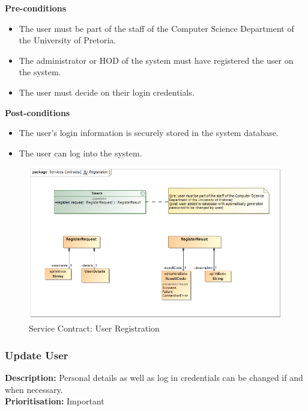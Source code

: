 \documentclass[a4paper]{article}
\begin{document}
    \textbf{Pre-conditions}
     \begin{itemize}
        \item The user must be part of the staff of the Computer Science Department of the University of Pretoria.
        \item The administrator or HOD of the system must have registered the user on the system.
        \item The user must decide on their login credentials.
   \end{itemize}
    
    \textbf{Post-conditions}
    \begin{itemize}
        \item The user's login information is securely stored in the system database.
        \item The user can log into the system.
    \end{itemize}
    
    	\begin{figure}[H]
    		\centering
    		\includegraphics[width=\textwidth]{5.1.2.Registration.Services.Contract.png}
    		\caption{Service Contract: User Registration}
    	\end{figure}
    
    
    \pagebreak
    \subsubsection{Update User}
   
    \textbf{Description:} Personal details as well as log in credentials can be changed if and when necessary.\\
     \textbf{Prioritisation:} Important\\
     
\end{document}
